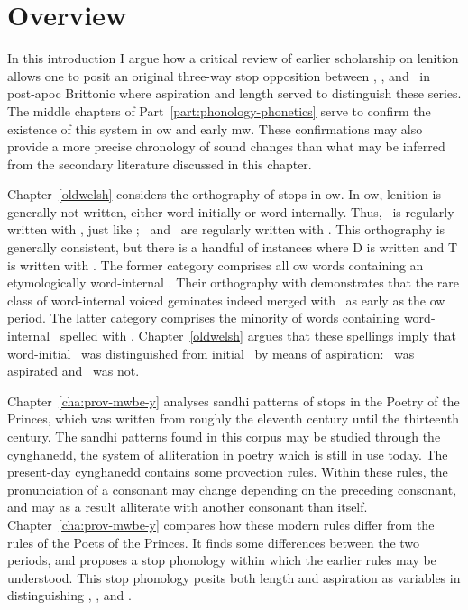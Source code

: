 \section{Overview}
\label{sec:overview-1}

In this introduction I argue how a critical review of earlier scholarship on lenition allows one to posit an original three-way stop opposition between \xT, \xD, and \lT\ in post-\gls{apoc} Brittonic where aspiration and length served to distinguish these series. The middle chapters of Part~\ref{part:phonology-phonetics} serve to confirm the existence of this system in \gls{ow} and early \gls{mw}. These confirmations may also provide a more precise chronology of sound changes than what may be inferred from the secondary literature discussed in this chapter.

Chapter~\ref{oldwelsh} considers the orthography of stops in \gls{ow}. In \gls{ow}, lenition is generally not written, either word-initially or word-internally. Thus, \lT\ is regularly written with , just like \xT; \lD\ and \xD\ are regularly written with . This orthography is generally consistent, but there is a handful of instances where \gls{D} is written  and \gls{T} is written with . The former category comprises all \gls{ow} words containing an etymologically word-internal \xD. Their orthography with  demonstrates that the rare class of word-internal voiced geminates indeed merged with \lT\ as early as the \gls{ow} period. The latter category comprises the minority of words containing word-internal \lT\ spelled with . Chapter~\ref{oldwelsh} argues that these spellings imply that word-initial \lT\ was distinguished from initial \xD\ by means of aspiration: \lT\ was aspirated and \xD\ was not.

Chapter~\ref{cha:prov-mwbe-y} analyses sandhi patterns of stops in the Poetry of the Princes, which was written from roughly the eleventh century until the thirteenth century. The sandhi patterns found in this corpus  may be studied through the cynghanedd, the system of alliteration in poetry which is still in use today. The present-day cynghanedd  contains some provection rules. Within these rules, the pronunciation of a consonant may change depending on the preceding consonant, and may as a result alliterate with another consonant than itself. Chapter~\ref{cha:prov-mwbe-y} compares how these modern rules differ from the rules of the Poets of the Princes. It finds some differences between the two periods, and proposes a stop phonology within which the earlier rules may be understood. This stop phonology posits both length and aspiration as variables in distinguishing \xT, \lT, and \xD.

